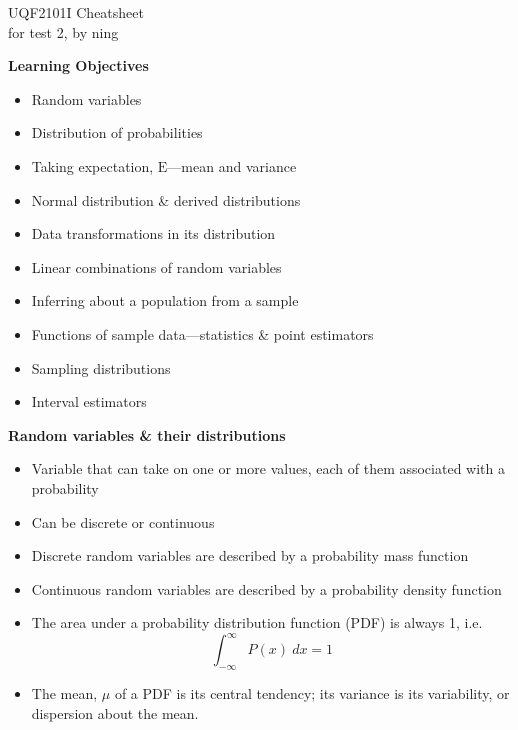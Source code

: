 \documentclass[a4paper]{article}
\newcommand{\heading}[1]{{\small\textbf{#1}}}
\begin{document}
\scriptsize                         %
\setlength\parindent{0pt}           %
\setlength{\abovedisplayskip}{3pt}  %
\setlength{\belowdisplayskip}{3pt}  %

\begin{center}
{\large UQF2101I Cheatsheet}\\{for test 2, by ning}
\end{center}

\begin{multicols*}{4}

\heading{Learning Objectives}
\begin{itemize} \itemsep -0.5em
    \item Random variables
    \item Distribution of probabilities
    \item Taking expectation, $\mathrm{E}$---mean and variance
    \item Normal distribution \& derived distributions
    \item Data transformations in its distribution
    \item Linear combinations of random variables
    \item Inferring about a population from a sample
    \item Functions of sample data---statistics \& point estimators
    \item Sampling distributions
    \item Interval estimators
\end{itemize}

\heading{Random variables \& their distributions}
\begin{itemize} \itemsep -0.5em
    \item Variable that can take on one or more values, each of them
        associated with a probability
    \item Can be discrete or continuous
    \item Discrete random variables are described by a probability mass
        function
    \item Continuous random variables are described by a probability
        density function
    \item The area under a probability distribution function (PDF) is 
        always 1, i.e. $$\int^{\infty}_{-\infty} P(x)\ dx = 1$$
    \item The mean, $\mu$ of a PDF is its central tendency; its variance
        is its variability, or dispersion about the mean.


\end{itemize}
\end{multicols*}
\end{document}
